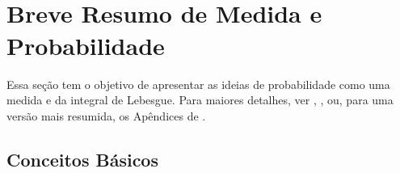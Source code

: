 \documentclass[
]{book}
\begin{document}
\(~\)

\(~\)

\hypertarget{appendix-apuxeandice}{%
\appendix}


\hypertarget{medprob}{%
\chapter{Breve Resumo de Medida e Probabilidade}\label{medprob}}

Essa seção tem o objetivo de apresentar as ideias de probabilidade como uma medida e da integral de Lebesgue. Para maiores detalhes, ver \citet{Ash00}, \citet{Billingsley86}, \citet{Shiryaev96} ou, para uma versão mais resumida, os Apêndices de \citet{Schervish12}.

\hypertarget{basprob}{%
\section{Conceitos Básicos}\label{basprob}}
\end{document}
